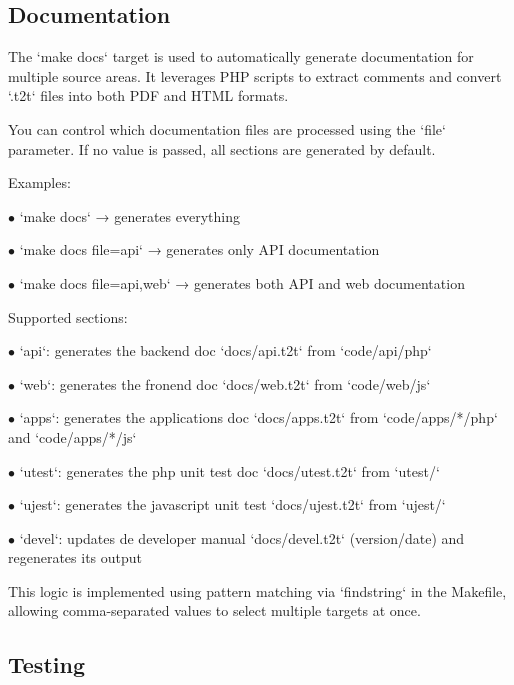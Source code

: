 \documentclass[a4paper]{article}
\begin{document}
\hypertarget{toc60}{}
\subsection{Documentation}

The `make docs` target is used to automatically generate documentation for multiple source areas. It leverages PHP scripts to extract comments and convert `.t2t` files into both PDF and HTML formats.

You can control which documentation files are processed using the `file` parameter. If no value is passed, all sections are generated by default.

Examples:

\begin{compactitem}
\item[\color{myblue}$\bullet$] `make docs` → generates everything
\item[\color{myblue}$\bullet$] `make docs file=api` → generates only API documentation
\item[\color{myblue}$\bullet$] `make docs file=api,web` → generates both API and web documentation
\end{compactitem}

Supported sections:

\begin{compactitem}
\item[\color{myblue}$\bullet$] `api`: generates the backend doc `docs/api.t2t` from `code/api/php`
\item[\color{myblue}$\bullet$] `web`: generates the fronend doc `docs/web.t2t` from `code/web/js`
\item[\color{myblue}$\bullet$] `apps`: generates the applications doc `docs/apps.t2t` from `code/apps/*/php` and `code/apps/*/js`
\item[\color{myblue}$\bullet$] `utest`: generates the php unit test doc `docs/utest.t2t` from `utest/`
\item[\color{myblue}$\bullet$] `ujest`: generates the javascript unit test `docs/ujest.t2t` from `ujest/`
\item[\color{myblue}$\bullet$] `devel`: updates de developer manual `docs/devel.t2t` (version/date) and regenerates its output
\end{compactitem}

This logic is implemented using pattern matching via `findstring` in the Makefile, allowing comma-separated values to select multiple targets at once.

\hypertarget{toc61}{}
\subsection{Testing}
\end{document}

